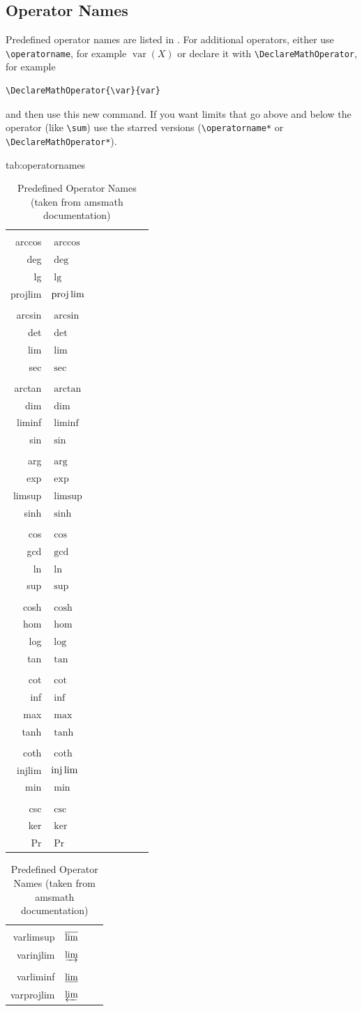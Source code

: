 \documentclass[mlmain]{jmlr}
\newcommand{\cs}[1]{\texttt{\char`\\#1}}
\begin{document}
\subsection{Operator Names}
\label{sec:op}

Predefined operator names are listed in .
For additional operators, either use \verb|\operatorname|,
for example $\operatorname{var}(X)$ or declare it with
\verb|\DeclareMathOperator|, for example
\begin{verbatim}
\DeclareMathOperator{\var}{var}
\end{verbatim}
and then use this new command. If you want limits that go above and
below the operator (like \verb|\sum|) use the starred versions
(\verb|\operatorname*| or \verb|\DeclareMathOperator*|).

\begin{table}[htbp]
\floatconts
  {tab:operatornames}%
  {\caption{Predefined Operator Names (taken from 
   \textsf{amsmath} documentation)}}%
  {%
\begin{tabular}{rlrlrlrl}
\cs{arccos} & $\arccos$ &  \cs{deg} & $\deg$ &  \cs{lg} & $\lg$ &  \cs{projlim} & $\projlim$ \\
\cs{arcsin} & $\arcsin$ &  \cs{det} & $\det$ &  \cs{lim} & $\lim$ &  \cs{sec} & $\sec$ \\
\cs{arctan} & $\arctan$ &  \cs{dim} & $\dim$ &  \cs{liminf} & $\liminf$ &  \cs{sin} & $\sin$ \\
\cs{arg} & $\arg$ &  \cs{exp} & $\exp$ &  \cs{limsup} & $\limsup$ &  \cs{sinh} & $\sinh$ \\
\cs{cos} & $\cos$ &  \cs{gcd} & $\gcd$ &  \cs{ln} & $\ln$ &  \cs{sup} & $\sup$ \\
\cs{cosh} & $\cosh$ &  \cs{hom} & $\hom$ &  \cs{log} & $\log$ &  \cs{tan} & $\tan$ \\
\cs{cot} & $\cot$ &  \cs{inf} & $\inf$ &  \cs{max} & $\max$ &  \cs{tanh} & $\tanh$ \\
\cs{coth} & $\coth$ &  \cs{injlim} & $\injlim$ &  \cs{min} & $\min$ \\
\cs{csc} & $\csc$ &  \cs{ker} & $\ker$ &  \cs{Pr} & $\Pr$
\end{tabular}\par
\begin{tabular}{rlrl}
\cs{varlimsup} & $\varlimsup$ 
& \cs{varinjlim} & $\varinjlim$\\
\cs{varliminf} & $\varliminf$ 
& \cs{varprojlim} & $\varprojlim$
\end{tabular}
}
\end{table}
\end{document}
